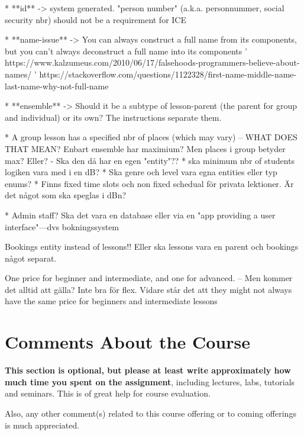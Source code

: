 \documentclass[a4paper]{scrartcl}
\begin{document}
* **id** -> system generated. "person number" (a.k.a. personnummer, social security nbr) should not be a requirement for ICE

* **name-issue** -> You can always construct a full name from its components, but you can't always deconstruct a full name into its components
' https://www.kalzumeus.com/2010/06/17/falsehoods-programmers-believe-about-names/
' https://stackoverflow.com/questions/1122328/first-name-middle-name-last-name-why-not-full-name 

* **ensemble** -> Should it be a subtype of lesson-parent (the parent for group and individual) or its own?  The instructions separate them.

* A group lesson has a specified nbr of places (which may vary) -- WHAT DOES THAT MEAN?
Enbart ensemble har maximium? Men places i group betyder max? Eller?
  - Ska den då har en egen "entity"??
* ska minimum nbr of students logiken vara med i en dB?
* Ska genre och level vara egna entities eller typ enums?
* Finns fixed time slots och non fixed schedual för privata lektioner. Är det något som ska speglas i dBn?

* Admin staff? Ska det vara en database eller via en "app providing a user interface"---dvs bokningssystem

Bookings entity instead of lessons!! Eller ska lessons vara en parent och bookings något separat.

One price for beginner and intermediate, and one for advanced. -- Men kommer det alltid att gälla? Inte bra för flex. Vidare står det att they might not always
have the same price for beginners and intermediate lessons


\section{Comments About the Course}

\textbf{This section is optional, but please at least write approximately how much time you spent on the assignment}, including lectures, labs, tutorials and seminars. This is of great help for course evaluation.

Also, any other comment(s) related to this course offering or to coming offerings is much appreciated. 
\end{document}
